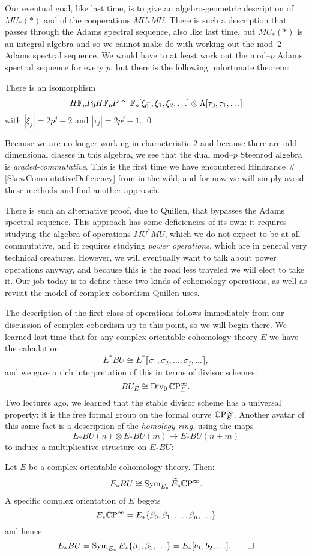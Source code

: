 Our eventual goal, like last time, is to give an algebro-geometric description of $MU_*(*)$ and of the cooperations $MU_* MU$.  There is such a description that passes through the Adams spectral sequence, also like last time, but $MU_*(*)$ is an integral algebra and so we cannot make do with working out the mod--$2$ Adams spectral sequence.  We would have to at least work out the mod--$p$ Adams spectral sequence for every $p$, but there is the following unfortunate theorem:
\begin{theorem}
There is an isomorphism
\[H\mathbb F_pP_0 H\mathbb F_pP \cong \mathbb F_p[\xi_0^\pm, \xi_1, \xi_2, \ldots] \otimes \Lambda[\tau_0, \tau_1, \ldots]\]
with $|\xi_j| = 2p^j-2$ and $|\tau_j| = 2p^j - 1$. \qed
\end{theorem}
\noindent Because we are no longer working in characteristic $2$ and because there are odd--dimensional classes in this algebra, we see that the dual mod--$p$ Steenrod algebra is \emph{graded-commutative}.  This is the first time we have encountered Hindrance \#\ref{SkewCommutativeDeficiency} from  in the wild, and for now we will simply avoid these methods and find another approach.

There is such an alternative proof, due to Quillen, that bypasses the Adams spectral sequence.  This approach has some deficiencies of its own: it requires studying the algebra of operations $MU^* MU$, which we do not expect to be at all commutative, and it requires studying \textit{power operations}, which are in general very technical creatures.  However, we will eventually want to talk about power operations anyway, and because this is the road less traveled we will elect to take it.  Our job today is to define these two kinds of cohomology operations, as well as revisit the model of complex cobordism Quillen uses.

The description of the first class of operations follows immediately from our discussion of complex cobordism up to this point, so we will begin there.  We learned last time that for any complex-orientable cohomology theory $E$ we have the calculation \[E^* BU \cong E^*\llbracket \sigma_1, \sigma_2, \ldots, \sigma_j, \ldots\rrbracket,\] and we gave a rich interpretation of this in terms of divisor schemes: \[BU_E \cong \operatorname{Div}_0 \mathbb{C}\mathrm P^\infty_E.\]  Two lectures ago, we learned that the stable divisor scheme has a universal property: it is the free formal group on the formal curve $\mathbb{C}\mathrm P^\infty_E$.  Another avatar of this same fact is a description of the \emph{homology ring}, using the maps \[E_* BU(n) \otimes E_* BU(m) \to E_* BU(n+m)\] to induce a multiplicative structure on $E_* BU$:
\begin{corollary}
Let $E$ be a complex-orientable cohomology theory. Then: \[E_* BU \cong \operatorname{Sym}_{E_*} \widetilde E_* \mathbb{C}\mathrm P^\infty.\]  A specific complex orientation of $E$ begets \[E_* \mathbb{C}\mathrm P^\infty = E_*\{\beta_0, \beta_1, \ldots, \beta_n, \ldots\}\] and hence \[E_* BU = \operatorname{Sym}_{E_*} E_*\{\beta_1, \beta_2, \ldots\} = E_*[b_1, b_2, \ldots]. \qed\]
\end{corollary} 

